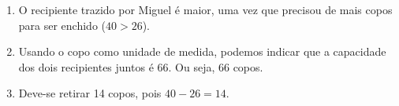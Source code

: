 \documentclass[10 pt,usenames,dvipsnames, oneside]{article}
\begin{document}
\ifdefined\prof
\begin{solucao}

\begin{enumerate}
  \item O recipiente trazido por Miguel é maior, uma vez que precisou de mais copos para ser enchido ($40>26$).
  \item Usando o copo como unidade de medida, podemos indicar que a capacidade dos dois recipientes juntos é 66. Ou seja, 66 copos.
  \item Deve-se retirar 14 copos, pois $40 - 26=14$.
\end{enumerate}

\end{solucao}
\fi
\end{document}

